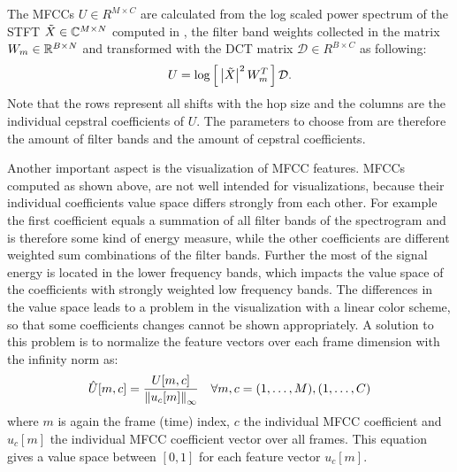 \FloatBarrier
\noindent
The MFCCs $U \in R^{M \times C}$ are calculated from the log scaled power spectrum of the STFT $\tilde{X} \in \mathbb{C}^{M \times N}$ computed in , the filter band weights collected in the matrix $W_m \in \mathbb{R}^{B \times N}$ and transformed with the DCT matrix $\mathcal{D} \in R^{B \times C}$ as following:
\begin{equation}
    U = \log{ \left[ \, \abs{\tilde{X}}^2 \, W_m^T \, \right] } \, \mathcal{D}.
\end{equation}
Note that the rows represent all shifts with the hop size and the columns are the individual cepstral coefficients of $U$.
The parameters to choose from are therefore the amount of filter bands and the amount of cepstral coefficients.

Another important aspect is the visualization of MFCC features.
MFCCs computed as shown above, are not well intended for visualizations, because their individual coefficients value space differs strongly from each other.
For example the first coefficient equals a summation of all filter bands of the spectrogram and is therefore some kind of energy measure, while the other coefficients are different weighted sum combinations of the filter bands.
Further the most of the signal energy is located in the lower frequency bands, which impacts the value space of the coefficients with strongly weighted low frequency bands.
The differences in the value space leads to a problem in the visualization with a linear color scheme, so that some coefficients changes cannot be shown appropriately.
A solution to this problem is to normalize the feature vectors over each frame dimension with the infinity norm as:
\begin{equation}\label{eq:signal_mfcc_norm}
  \hat{U}[m, c] = \frac{U[m, c]}{\norm{u_c[m]}_\infty} \quad \forall m, c = (1, \dots, M), (1, \dots, C)
\end{equation}
where $m$ is again the frame (time) index, $c$ the individual MFCC coefficient and $u_c[m]$ the individual MFCC coefficient vector over all frames.
This equation gives a value space between $[0, 1]$ for each feature vector $u_c[m]$.

